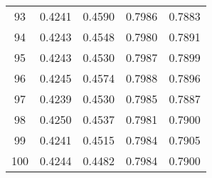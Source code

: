 \documentclass{article}
\begin{document}
\begin{longtable}{c c c c c}
    93 & 0.4241 & 0.4590 & 0.7986 & 0.7883 \\
    94 & 0.4243 & 0.4548 & 0.7980 & 0.7891 \\
    95 & 0.4243 & 0.4530 & 0.7987 & 0.7899 \\
    96 & 0.4245 & 0.4574 & 0.7988 & 0.7896 \\
    97 & 0.4239 & 0.4530 & 0.7985 & 0.7887 \\
    98 & 0.4250 & 0.4537 & 0.7981 & 0.7900 \\
    99 & 0.4241 & 0.4515 & 0.7984 & 0.7905 \\
    100 & 0.4244 & 0.4482 & 0.7984 & 0.7900 \\
    \end{longtable}


\begin{comment}   


\end{comment}
\end{document}
